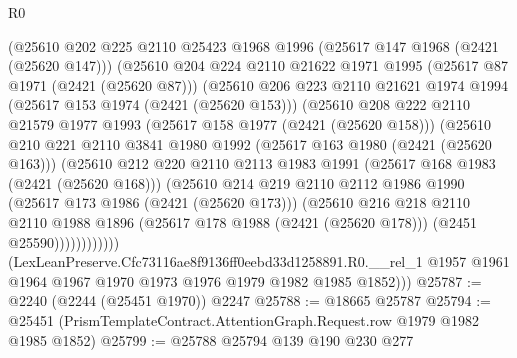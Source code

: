 \begin{lexlean}{R0}
\begin{coremodule}
              (@25610
                @202
                @225
                @2110
                @25423
                @1968
                @1996
                (@25617 @147 @1968 (@2421 (@25620 @147)))
                (@25610
                  @204
                  @224
                  @2110
                  @21622
                  @1971
                  @1995
                  (@25617 @87 @1971 (@2421 (@25620 @87)))
                  (@25610
                    @206
                    @223
                    @2110
                    @21621
                    @1974
                    @1994
                    (@25617 @153 @1974 (@2421 (@25620 @153)))
                    (@25610
                      @208
                      @222
                      @2110
                      @21579
                      @1977
                      @1993
                      (@25617 @158 @1977 (@2421 (@25620 @158)))
                      (@25610
                        @210
                        @221
                        @2110
                        @3841
                        @1980
                        @1992
                        (@25617 @163 @1980 (@2421 (@25620 @163)))
                        (@25610
                          @212
                          @220
                          @2110
                          @2113
                          @1983
                          @1991
                          (@25617 @168 @1983 (@2421 (@25620 @168)))
                          (@25610
                            @214
                            @219
                            @2110
                            @2112
                            @1986
                            @1990
                            (@25617 @173 @1986 (@2421 (@25620 @173)))
                            (@25610
                              @216
                              @218
                              @2110
                              @2110
                              @1988
                              @1896
                              (@25617 @178 @1988 (@2421 (@25620 @178)))
                              (@2451 @25590))))))))))))
        (LexLeanPreserve.Cfc73116ae8f9136ff0eebd33d1258891.R0.__rel_1
          @1957
          @1961
          @1964
          @1967
          @1970
          @1973
          @1976
          @1979
          @1982
          @1985
          @1852)))
@25787 := @2240 (@2244 (@25451 @1970)) @2247
@25788 := @18665 @25787
@25794 := @25451 (PrismTemplateContract.AttentionGraph.Request.row @1979 @1982 @1985 @1852)
@25799 := @25788 @25794 @139 @190 @230 @277

\end{coremodule}
\end{lexlean}
